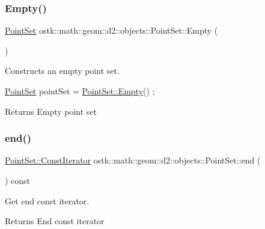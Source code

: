 \subsubsection{\texorpdfstring{Empty()}{Empty()}}
{\footnotesize\ttfamily \hyperlink{classostk_1_1math_1_1geom_1_1d2_1_1objects_1_1_point_set}{Point\+Set} ostk\+::math\+::geom\+::d2\+::objects\+::\+Point\+Set\+::\+Empty (\begin{DoxyParamCaption}{ }\end{DoxyParamCaption})\hspace{0.3cm}{\ttfamily [static]}}



Constructs an empty point set. 


\begin{DoxyCode}
\hyperlink{classostk_1_1math_1_1geom_1_1d2_1_1objects_1_1_point_set_a736eff7b0d1c876b304bfa7d1d2d0095}{PointSet} pointSet = \hyperlink{classostk_1_1math_1_1geom_1_1d2_1_1objects_1_1_point_set_a09f5e125c7b4545a75e4eea6193bf615}{PointSet::Empty}() ;
\end{DoxyCode}


\begin{DoxyReturn}{Returns}
Empty point set 
\end{DoxyReturn}
\mbox{\label{classostk_1_1math_1_1geom_1_1d2_1_1objects_1_1_point_set_a49b262b5d0e453fd1870cce164b7288d}} 
\subsubsection{\texorpdfstring{end()}{end()}}
{\footnotesize\ttfamily \hyperlink{classostk_1_1math_1_1geom_1_1d2_1_1objects_1_1_point_set_a6a0613cc686e9247430658eee91036d0}{Point\+Set\+::\+Const\+Iterator} ostk\+::math\+::geom\+::d2\+::objects\+::\+Point\+Set\+::end (\begin{DoxyParamCaption}{ }\end{DoxyParamCaption}) const}



Get end const iterator. 

\begin{DoxyReturn}{Returns}
End const iterator 
\end{DoxyReturn}
\mbox{\label{classostk_1_1math_1_1geom_1_1d2_1_1objects_1_1_point_set_a1d08aa1b16ad2865f09a25267c63e58b}} 
